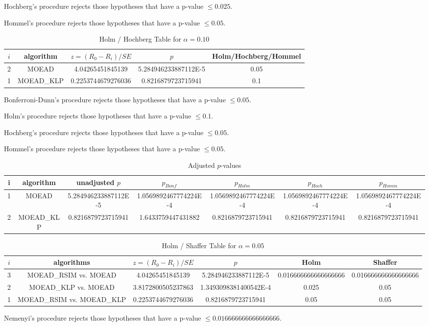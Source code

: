 \documentclass[a4paper,10pt]{article}
\begin{document}
\begin{landscape}
Hochberg's procedure rejects those hypotheses that have a p-value $\le0.025$.


Hommel's procedure rejects those hypotheses that have a p-value $\le0.05$.


\begin{table}[!htp]
\centering\tiny
\caption{Holm / Hochberg Table for $\alpha=0.10$}
\begin{tabular}{ccccc}
$i$&algorithm&$z=(R_0 - R_i)/SE$&$p$&Holm/Hochberg/Hommel\\
\hline
2&MOEAD&4.04265451845139&5.284946233887112E-5&0.05\\
1&MOEAD_KLP&0.2253744679276036&0.8216879723715941&0.1\\
\hline
\end{tabular}
\end{table}
Bonferroni-Dunn's procedure rejects those hypotheses that have a p-value $\le0.05$.


Holm's procedure rejects those hypotheses that have a p-value $\le0.1$.


Hochberg's procedure rejects those hypotheses that have a p-value $\le0.05$.


Hommel's procedure rejects those hypotheses that have a p-value $\le0.05$.


\begin{table}[!htp]
\centering\tiny
\caption{Adjusted $p$-values}
\begin{tabular}{ccccccc}
i&algorithm&unadjusted $p$&$p_{Bonf}$&$p_{Holm}$&$p_{Hoch}$&$p_{Homm}$\\
\hline
1&MOEAD&5.284946233887112E-5&1.0569892467774224E-4&1.0569892467774224E-4&1.0569892467774224E-4&1.0569892467774224E-4\\
2&MOEAD_KLP&0.8216879723715941&1.6433759447431882&0.8216879723715941&0.8216879723715941&0.8216879723715941\\
\hline
\end{tabular}
\end{table}

\begin{table}[!htp]
\centering\tiny
\caption{Holm / Shaffer Table for $\alpha=0.05$}
\begin{tabular}{cccccc}
$i$&algorithms&$z=(R_0 - R_i)/SE$&$p$&Holm&Shaffer\\
\hline
3&MOEAD_RSIM vs. MOEAD&4.04265451845139&5.284946233887112E-5&0.016666666666666666&0.016666666666666666\\
2&MOEAD_KLP vs. MOEAD&3.8172800505237863&1.3493098381400542E-4&0.025&0.05\\
1&MOEAD_RSIM vs. MOEAD_KLP&0.2253744679276036&0.8216879723715941&0.05&0.05\\
\hline
\end{tabular}
\end{table}
Nemenyi's procedure rejects those hypotheses that have a p-value $\le0.016666666666666666$.



\end{landscape}
\end{document}
